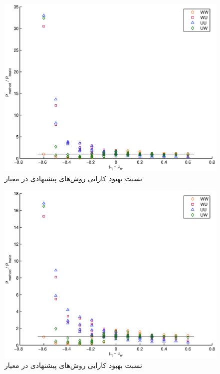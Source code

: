 \begin{figure}[!htb]
  \begin{center}
    \includegraphics[width=12cm]{scatter_ratio_CN.eps}
    \caption{نسبت بهبود کارایی روش‌های پیشنهادی در معیار }
    \label{fig:scatter_ratio_CN}
  \end{center}
\end{figure}
\begin{figure}[!htb]
  \begin{center}
    \includegraphics[width=12cm]{scatter_ratio_AA.eps}
    \caption{نسبت بهبود کارایی روش‌های پیشنهادی در معیار }
    \label{fig:scatter_ratio_AA}
  \end{center}
\end{figure}
